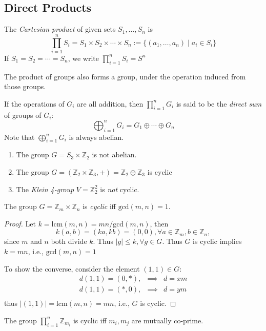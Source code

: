 \subsection{Direct Products}
\begin{definition}
The \emph{Cartesian product} of given sets $S_1,\dots,S_n$ is
\[
\prod_{i=1}^nS_i=S_1\times S_2\times\cdots\times S_n:=\{(a_1,\dots,a_n)\mid a_i\in S_i\}
\]
If $S_1= S_2=\cdots= S_n$, we write $\prod_{i=1}^nS_i=S^n$
\end{definition}
\begin{proposition}
The product of groups also forms a group, under the operation induced from those groups.
\end{proposition}
\begin{remark}
If the operations of $G_i$ are all addition, then $\prod_{i=1}^nG_i$ is said to be the \emph{direct sum} of groups of $G_i$:
\[
\bigoplus_{i=1}^nG_i=G_1\oplus \cdots\oplus G_n
\]
Note that $\bigoplus_{i=1}^nG_i$ is always abelian.
\end{remark}
\begin{example}
\begin{enumerate}
\item
The group $G=S_3\times\mathbb{Z}_2$ is not abelian.
\item
The group $G=(\mathbb{Z}_2\times\mathbb{Z}_3,+) =\mathbb{Z}_2\oplus  \mathbb{Z}_3$ is cyclic
\item
The \emph{Klein 4-group} $V=\mathbb{Z}_2^2$ is \emph{not} cyclic.
\end{enumerate}
\end{example}
\begin{theorem}
The group $G=\mathbb{Z}_m\times\mathbb{Z}_n$ is \emph{cyclic} iff $\mbox{gcd}(m,n) = 1$.
\end{theorem}
\begin{proof}
Let $k=\mbox{lcm}(m,n) = mn/\mbox{gcd}(m,n)$, then
\[
k(a,b) = (ka,kb)=(0,0),\forall a\in\mathbb{Z}_m,b\in\mathbb{Z}_n,
\]
since $m$ and $n$ both divide $k$. Thus $|g|\le k,\forall g\in G$. Thus $G$ is cyclic implies $k=mn$, i.e., $\mbox{gcd}(m,n)=1$

To show the converse, consider the element $(1,1)\in G$:
\[
\begin{array}{lll}
d(1,1)=(0,*),&\implies&d=xm\\
d(1,1)=(*,0),&\implies&d=ym\\
\end{array}
\]
thus $|(1,1)|=\mbox{lcm}(m,n) = mn$, i.e., $G$ is cyclic.
\end{proof}
\begin{corollary}
The group $\prod_{i=1}^n\mathbb{Z}_{m_i}$ is cyclic iff $m_i,m_j$ are mutually co-prime.
\end{corollary}

